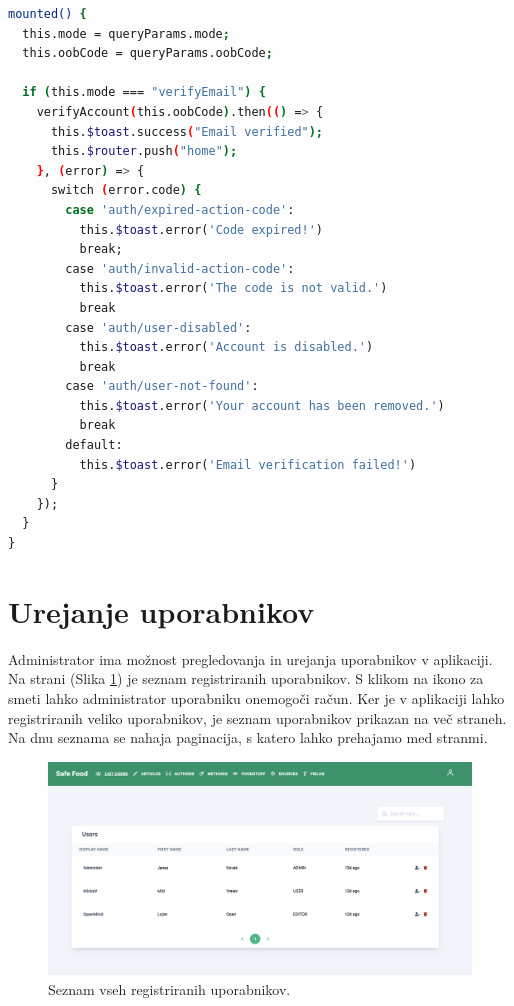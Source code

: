 \begin{lstlisting}[language=bash, style=mystyle,caption={Primer kode, za preverjanje uporabnika.}, label=lst:verify-username]
mounted() {
  this.mode = queryParams.mode;
  this.oobCode = queryParams.oobCode;
    
  if (this.mode === "verifyEmail") {
    verifyAccount(this.oobCode).then(() => {
      this.$toast.success("Email verified");
      this.$router.push("home");
    }, (error) => {
      switch (error.code) {
        case 'auth/expired-action-code':
          this.$toast.error('Code expired!')
          break;
        case 'auth/invalid-action-code':
          this.$toast.error('The code is not valid.')
          break
        case 'auth/user-disabled':
          this.$toast.error('Account is disabled.')
          break
        case 'auth/user-not-found':
          this.$toast.error('Your account has been removed.')
          break
        default:
          this.$toast.error('Email verification failed!')
      }
    });
  }
}
\end{lstlisting}
\clearpage


\section{Urejanje uporabnikov}
\label{administracija-uporabnikov}
Administrator ima možnost pregledovanja in urejanja uporabnikov v aplikaciji. Na strani  (Slika \ref{users-list-page}) je seznam registriranih uporabnikov. S klikom na ikono za smeti lahko administrator uporabniku onemogoči račun. Ker je v aplikaciji lahko registriranih veliko uporabnikov, je seznam uporabnikov prikazan na več straneh. Na dnu seznama se nahaja paginacija, s katero lahko prehajamo med stranmi.

\begin{figure}[h]
\begin{center}
\includegraphics[width=1\textwidth]{slike/users-list.png}
\end{center}
\caption{ Seznam vseh registriranih uporabnikov. }
\label{users-list-page}
\end{figure}

